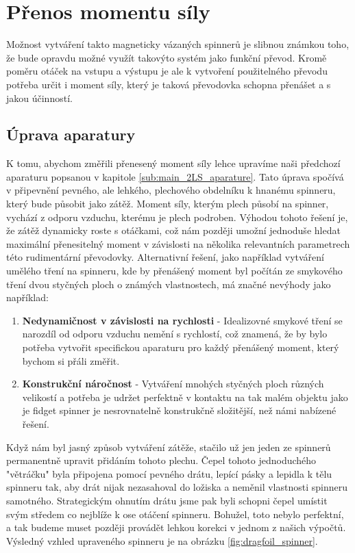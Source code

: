 \chapter{Přenos momentu síly}

Možnost vytváření takto magneticky vázaných spinnerů je slibnou známkou toho, že bude opravdu možné využít takovýto systém jako funkční převod. Kromě poměru otáček na vstupu a výstupu je ale k vytvoření použitelného převodu potřeba určit i moment síly, který je taková převodovka schopna přenášet a s jakou účinností.

\section{Úprava aparatury}

K tomu, abychom změřili přenesený moment síly lehce upravíme naši předchozí aparaturu popsanou v kapitole \ref{sub:main_2LS_aparature}. Tato úprava spočívá v připevnění pevného, ale lehkého, plechového obdelníku k hnanému spinneru, který bude působit jako zátěž. Moment síly, kterým plech působí na spinner, vychází z odporu vzduchu, kterému je plech podroben. Výhodou tohoto řešení je, že zátěž dynamicky roste s otáčkami, což nám později umožní jednoduše hledat maximální přenesitelný moment v závislosti na několika relevantních parametrech této rudimentární převodovky. Alternativní řešení, jako například vytváření umělého tření na spinneru, kde by přenášený moment byl počítán ze smykového tření dvou styčných ploch o známých vlastnostech, má značné nevýhody jako například: 

\begin{enumerate}[topsep=0pt, partopsep=0pt]
    \setlength{\itemsep}{0pt}%
    \setlength{\parskip}{0pt}%
    \item \textbf{Nedynamičnost v závislosti na rychlosti} - Idealizovné smykové tření se narozdíl od odporu vzduchu nemění s rychlostí, což znamená, že by bylo potřeba vytvořit specifickou aparaturu pro každý přenášený moment, který bychom si přáli změřit.
    \item \textbf{Konstrukční náročnost} - Vytváření mnohých styčných ploch různých velikostí a potřeba je udržet perfektně v kontaktu na tak malém objektu jako je fidget spinner je nesrovnatelně konstrukčně složitější, než námi nabízené řešení.
\end{enumerate}

Když nám byl jasný způsob vytváření zátěže, stačilo už jen jeden ze spinnerů permanentně upravit přidáním tohoto plechu. Čepel tohoto jednoduchého "větráčku" byla připojena pomocí pevného drátu, lepící pásky a lepidla k tělu spinneru tak, aby drát nijak nezasahoval do ložiska a neměnil vlastnosti spinneru samotného. Strategickým ohnutím drátu jsme pak byli schopni čepel umístit svým středem co nejblíže k ose otáčení spinneru. Bohužel, toto nebylo perfektní, a tak budeme muset později provádět lehkou korekci v jednom z našich výpočtů.
Výsledný vzhled upraveného spinneru je na obrázku \ref{fig:dragfoil_spinner}.

